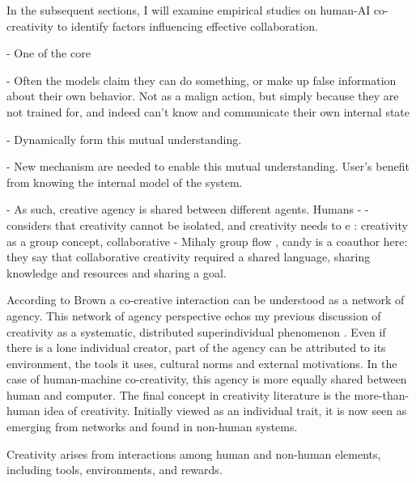 In the subsequent sections, I will examine empirical studies on human-AI co-creativity to identify factors influencing effective collaboration.






- One of the core 



- Often the models claim they can do something, or make up false information about their own behavior. Not as a malign action, but simply because they are not trained for, and indeed can't know and communicate their own internal state \cite{Templeton2024-ej, Turpin2023-ow} 


- Dynamically form this mutual understanding. 


- New mechanism are needed to enable this mutual understanding. User's benefit from knowing the internal model of the system. 

- As such, creative agency is shared between different agents. Humans 
- 
- \cite{mihaly} considers that creativity cannot be isolated, and creativity needs to e 
\cite{Aragon2011-mv}: creativity as a group concept, collaborative
- Mihaly group flow
\cite{Mamykina2002-lm}, candy is a coauthor here: they say that collaborative creativity required a shared language, sharing knowledge and resources and sharing a goal. 

According to Brown \cite{Brown2016-tc} a co-creative interaction can be understood as a network of agency. This network of agency perspective echos my previous discussion of creativity as a systematic, distributed superindividual phenomenon \cite{Bown2012-gg, Schaffer1994-gy, Csikszentmihalyi2015-rq, Csikszentmihalyi2014-cq, Amabile1996-pt, Rhodes1961-od}. Even if there is a lone individual creator, part of the agency can be attributed to its environment, the tools it uses, cultural norms and external motivations. In the case of human-machine co-creativity, this agency is more equally shared between human and computer. 
The final concept in creativity literature is the more-than-human idea of creativity. Initially viewed as an individual trait, it is now seen as emerging from networks and found in non-human systems.

Creativity arises from interactions among human and non-human elements, including tools, environments, and rewards.


